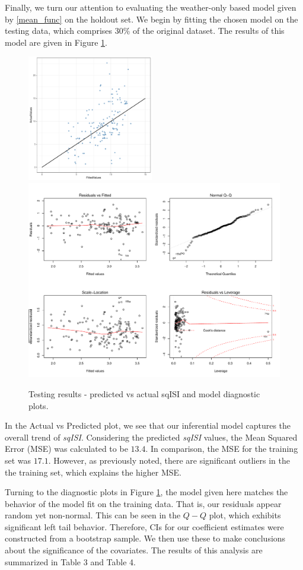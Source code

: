 \documentclass{article}
\begin{document}
Finally, we turn our attention to evaluating the weather-only based model given by \eqref{mean_func} on the holdout set. We begin by fitting the chosen model on the testing data, which comprises 30\% of the original dataset. The results of this model are given in Figure \ref{fig:test_set_plots}. 
\begin{figure}[h!]
\centering
\includegraphics[width = .45\textwidth, height = 5.5cm]{pred_plot.pdf}
\includegraphics[width = .45\textwidth]{TestSetDiagnostics.pdf}
\caption{Testing results - predicted vs actual sqISI and model diagnostic plots.}
\label{fig:test_set_plots}
\end{figure}
In the Actual vs Predicted plot, we see that our inferential model captures the overall trend of \textit{sqISI}. Considering the predicted \textit{sqISI} values, the Mean Squared Error (MSE) was calculated to be $13.4$. In comparison, the MSE for the training set was $17.1$. However, as previously noted, there are significant outliers in the the training set, which explains the higher MSE.

Turning to the diagnostic plots in Figure \ref{fig:test_set_plots}, the model given here matches the behavior of the model fit on the training data. That is, our residuals appear random yet non-normal. This can be seen in the $Q-Q$ plot, which exhibits significant left tail behavior. Therefore, CIs for our coefficient estimates were constructed from a bootstrap sample. We then use these to make conclusions about the significance of the covariates. The results of this analysis are summarized in Table 3 and Table 4. 
\end{document}
